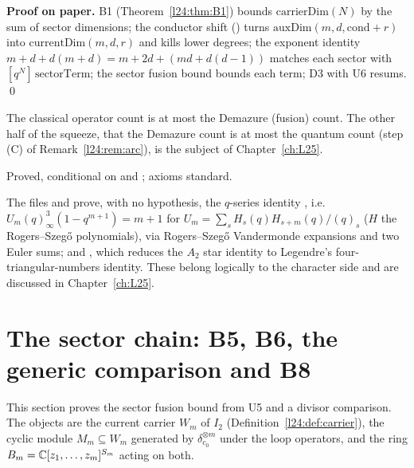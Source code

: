 \textbf{Proof on paper.} B1 (Theorem~\ref{l24:thm:B1}) bounds $\mathrm{carrierDim}(N)$ by the sum of sector dimensions;
the conductor shift () turns $\mathrm{auxDim}(m,d,\mathrm{cond}+r)$ into $\mathrm{currentDim}(m,d,r)$
and kills lower degrees; the exponent identity $m+d+d(m+d)=m+2d+(md+d(d-1))$ matches each sector with
$[q^N]\,\mathrm{sectorTerm}$; the sector fusion bound bounds each term; D3 with U6 resums. \qed

\begin{physics}
The classical operator count is at most the Demazure (fusion) count. The other half of the squeeze, that the Demazure count
is at most the quantum count (step (C) of Remark~\ref{l24:rem:arc}), is the subject of Chapter~\ref{ch:L25}.
\end{physics}

\begin{status}
Proved, conditional on  and ; axioms standard.
\end{status}

\begin{remark}\label{l24:rem:mehler}
The files  and  prove, with no hypothesis, the
$q$-series identity , i.e.\ $U_m(q)_\infty^3(1-q^{m+1})=m+1$ for
$U_m=\sum_sH_s(q)H_{s+m}(q)/(q)_s$ ($H$ the Rogers--Szeg\H{o} polynomials), via Rogers--Szeg\H{o} Vandermonde
expansions and two Euler sums; and , which reduces the $A_2$ star identity
to Legendre's four-triangular-numbers identity. These belong logically to the character side and are discussed
in Chapter~\ref{ch:L25}.
\end{remark}

\section{The sector chain: B5, B6, the generic comparison and B8}\label{l24:sec:sector}

This section proves the sector fusion bound from U5 and a divisor comparison. The objects are the current
carrier $W_m$ of $I_2$ (Definition~\ref{l24:def:carrier}), the cyclic module $M_m\subseteq W_m$ generated by
$\delta_{c_0}^{\otimes m}$ under the loop operators, and the ring $B_m={\mathbb{C}}[z_1,\dots,z_m]^{S_m}$ acting on both.

